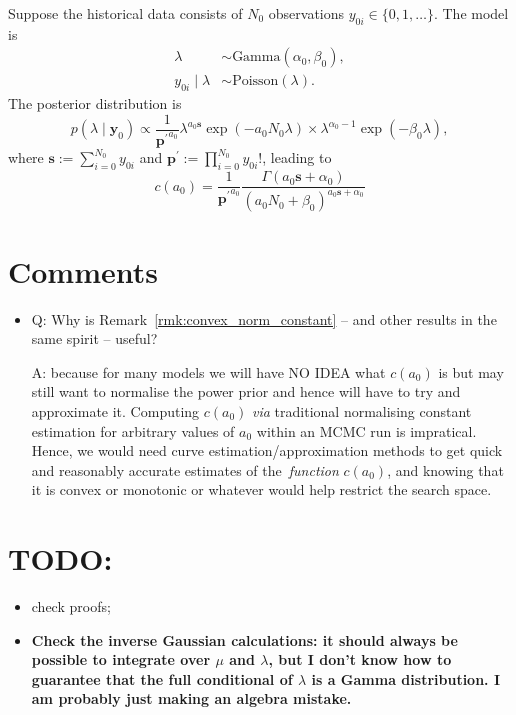 \documentclass[a4paper, notitlepage, 11pt]{article}
\begin{document}
Suppose the historical data consists of $N_0$ observations $y_{0i} \in \{0, 1, \ldots \}$.
The model is 
\begin{align*}
 \lambda &\sim \text{Gamma}(\alpha_0, \beta_0),\\
 y_{0i} \mid \lambda &\sim \text{Poisson}(\lambda).
\end{align*}
The posterior distribution is 
\begin{equation}
 p(\lambda \mid \boldsymbol y_0) \propto \frac{1}{\boldsymbol {p^\prime}^{a_0} } \lambda^{a_0\boldsymbol s} \exp(-a_0 N_0 \lambda) \times \lambda^{\alpha_0-1} \exp(-\beta_0\lambda),
\end{equation}
where $\boldsymbol s := \sum_{i=0}^{N_0} y_{0i}$ and $\boldsymbol p^\prime := \prod_{i = 0}^{N_0} y_{0i}!$, leading to
\begin{equation}
 \label{eq:cA0_poisson}
 c(a_0) = \frac{1}{\boldsymbol {p^\prime}^{a_0} } \frac{\Gamma(a_0\boldsymbol s + \alpha_0)}{\left( a_0N_0 + \beta_0 \right)^{a_0\boldsymbol s + \alpha_0} }
\end{equation}

\section*{Comments}
\begin{itemize}
 \item  Q: Why is Remark~\ref{rmk:convex_norm_constant} -- and other results in the same spirit -- useful? 
 
 A: because for many models we will have NO IDEA what $c(a_0)$ is but may still want to normalise the power prior and hence will have to try and approximate it. 
 Computing $c(a_0)$ \textit{via} traditional normalising constant estimation for arbitrary values of $a_0$ within an MCMC run is impratical.
 Hence, we would need curve estimation/approximation methods to get quick and reasonably accurate estimates of the~\textit{function} $c(a_0)$, and knowing that it is convex or monotonic or whatever would help restrict the search space.
\end{itemize}

\section*{TODO:}
\begin{itemize}
 \item check proofs;
 \item \textbf{Check the inverse Gaussian calculations: it should always be possible to integrate over $\mu$ and $\lambda$, but I don't know how to guarantee that the full conditional of $\lambda$ is a Gamma distribution. 
 I am probably just making an algebra mistake.}
\end{itemize}
\end{document}
